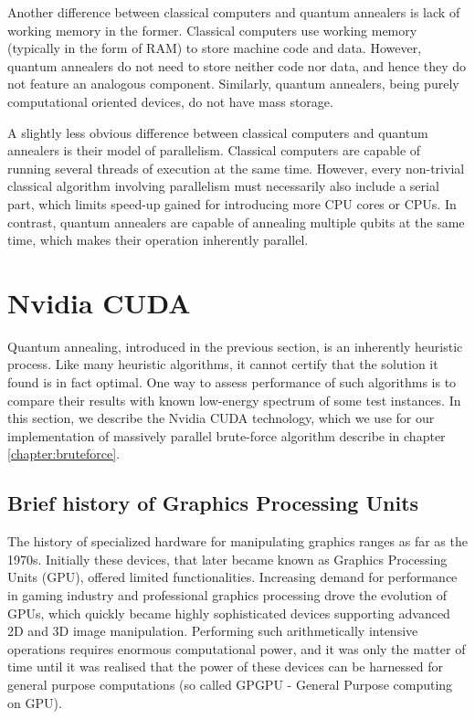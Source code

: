 Another difference between classical computers and quantum annealers is lack of working memory in the former. Classical computers use working memory (typically in the form of RAM) to store machine code and data. However, quantum annealers do not need to store neither code nor data, and hence they do not feature an analogous component. Similarly, quantum annealers, being purely computational oriented devices, do not have mass storage.

A slightly less obvious difference between classical computers and quantum annealers is their model of parallelism. Classical computers are capable of running several threads of execution at the same time. However, every non-trivial classical algorithm involving parallelism must necessarily also include a serial part, which limits speed-up gained for introducing more CPU cores or CPUs. In contrast, quantum annealers are capable of annealing multiple qubits at the same time, which makes their operation inherently parallel.

\section{Nvidia CUDA}

Quantum annealing, introduced in the previous section, is an inherently heuristic process. Like many heuristic algorithms, it cannot certify that the solution it found is in fact optimal. One way to assess performance of such algorithms is to compare their results with known low-energy spectrum of some test instances. In this section, we describe the Nvidia CUDA technology, which we use for our implementation of massively parallel brute-force algorithm describe in chapter \ref{chapter:bruteforce}.

\subsection{Brief history of Graphics Processing Units}
The history of specialized hardware for manipulating graphics ranges as far as the 1970s. Initially these devices, that later became known as Graphics Processing Units (GPU), offered limited functionalities. Increasing demand for performance in gaming industry and professional graphics processing drove the evolution of GPUs, which quickly became highly sophisticated devices supporting advanced 2D and 3D image manipulation. Performing such arithmetically intensive operations requires enormous computational power, and it was only the matter of time until it was realised that the power of these devices can be harnessed for general purpose computations (so called GPGPU - General Purpose computing on GPU).

